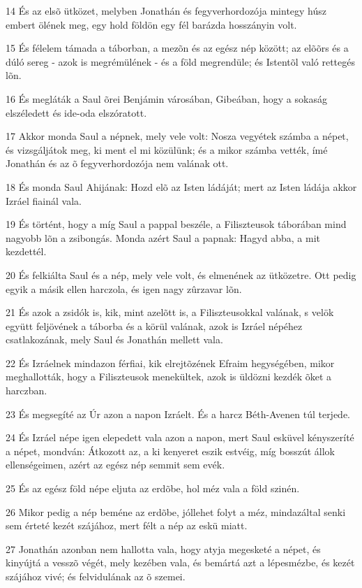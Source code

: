 \par 14 És az elsõ ütközet, melyben Jonathán és fegyverhordozója mintegy húsz embert ölének meg, egy hold földön egy fél barázda hosszányin volt.
\par 15 És félelem támada a táborban, a mezõn és az egész nép között; az elõõrs és a dúló sereg - azok is megrémülének - és a föld megrendüle; és Istentõl való rettegés lõn.
\par 16 És megláták a Saul õrei Benjámin városában, Gibeában, hogy a sokaság elszéledett és ide-oda elszóratott.
\par 17 Akkor monda Saul a népnek, mely vele volt: Nosza vegyétek számba a népet, és vizsgáljátok meg, ki ment el mi közülünk; és a mikor számba vették, ímé Jonathán és az õ fegyverhordozója nem valának ott.
\par 18 És monda Saul Ahijának: Hozd elõ az Isten ládáját; mert az Isten ládája akkor Izráel fiainál vala.
\par 19 És történt, hogy a míg Saul a pappal beszéle, a Filiszteusok táborában mind nagyobb lõn a zsibongás. Monda azért Saul a papnak: Hagyd abba, a mit kezdettél.
\par 20 És felkiálta Saul és a nép, mely vele volt, és elmenének az ütközetre. Ott pedig egyik a másik ellen harczola, és igen nagy zûrzavar lõn.
\par 21 És azok a zsidók is, kik, mint azelõtt is, a Filiszteusokkal valának, s velök együtt feljövének a táborba és a körül valának, azok is Izráel népéhez csatlakozának, mely Saul és Jonathán mellett vala.
\par 22 És Izráelnek mindazon férfiai, kik elrejtõzének Efraim hegységében, mikor meghallották, hogy a Filiszteusok menekültek, azok is üldözni kezdék õket a harczban.
\par 23 És megsegíté az Úr azon a napon Izráelt. És a harcz Béth-Avenen túl terjede.
\par 24 És Izráel népe igen elepedett vala azon a napon, mert Saul esküvel kényszeríté a népet, mondván: Átkozott az, a ki kenyeret eszik estvéig, míg bosszút állok ellenségeimen, azért az egész nép semmit sem evék.
\par 25 És az egész föld népe eljuta az erdõbe, hol méz vala a föld szinén.
\par 26 Mikor pedig a nép beméne az erdõbe, jóllehet folyt a méz, mindazáltal senki sem érteté kezét szájához, mert félt a nép az eskü miatt.
\par 27 Jonathán azonban nem hallotta vala, hogy atyja megesketé a népet, és kinyújtá a vesszõ végét, mely kezében vala, és bemártá azt a lépesmézbe, és kezét szájához vivé; és felvidulának az õ szemei.
